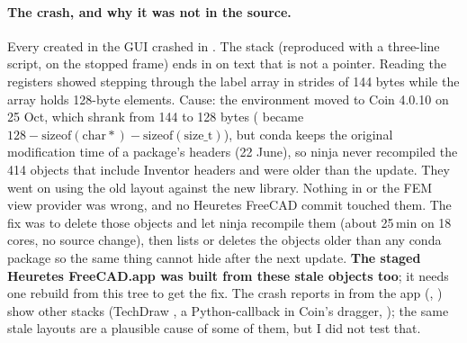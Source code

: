 \paragraph{The crash, and why it was not in the source.} Every  created in the GUI
crashed in . The stack (reproduced with a three-line script,  on
the stopped frame) ends in  on text that is not a pointer. Reading the registers showed
 stepping through the label array in strides of 144 bytes while the array holds 128-byte
elements. Cause: the environment moved to Coin 4.0.10 on 25 Oct, which shrank  from 144 to
128 bytes ( became $128-\mathrm{sizeof(char*)}-\mathrm{sizeof(size\_t)}$), but conda keeps
the original modification time of a package's headers (22 June), so ninja never recompiled the 414 objects that
include Inventor headers and were older than the update. They went on using the old layout against the new library.
Nothing in  or the FEM view provider was wrong, and no Heuretes FreeCAD commit touched them. The
fix was to delete those objects and let ninja recompile them (about 25\,min on 18 cores, no source change), then
 lists or deletes the objects older than any conda
package so the same thing cannot hide after the next  update. \textbf{The staged Heuretes FreeCAD.app was
built from these stale objects too}; it needs one rebuild from this tree to get the fix. The crash reports in
 from the app (, ) show other stacks
(TechDraw , a Python-callback in Coin's dragger, ); the
same stale layouts are a plausible cause of some of them, but I did not test that.

